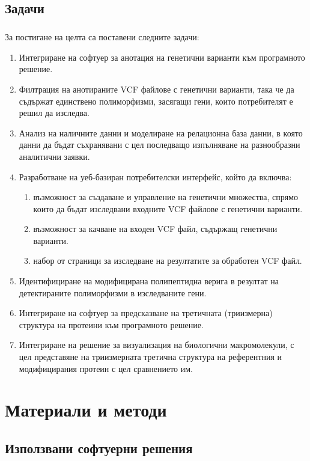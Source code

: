 \documentclass[pdftex,cyrillic,14pt,a4page,twoside,openright]{extreport}
\begin{document}
\section{Задачи}
\paragraph{}
За постигане на целта са поставени следните задачи:
\begin{enumerate}
	\item Интегриране на софтуер за анотация на генетични варианти към програмното решение.
	\item Филтрация на анотираните VCF файлове с генетични варианти, така че да съдържат единствено полиморфизми, засягащи гени, които потребителят е решил да изследва.
	\item Анализ на наличните данни и моделиране на релационна база данни, в която данни да бъдат съхранявани с цел последващо изпълняване на разнообразни аналитични заявки.
	\item Разработване на уеб-базиран потребителски интерфейс, който да включва:
		\begin{enumerate}
			\item възможност за създаване и управление на генетични множества, спрямо които да бъдат изследвани входните VCF файлове с генетични варианти.
			\item възможност за качване на входен VCF файл, съдържащ генетични варианти.
			\item набор от страници за изследване на резултатите за обработен VCF файл.
		\end{enumerate}
	\item Идентифициране на модифицирана полипептидна верига в резултат на детектираните полиморфизми в изследваните гени.
	\item Интегриране на софтуер за предсказване на третичната (триизмерна) структура на протеини към програмното решение.
	\item Интегриране на решение за визуализация на биологични макромолекули, с цел представяне на триизмерната третична структура на референтния и модифицирания протеин с цел сравнението им.
\end{enumerate}

\chapter{Материали и методи}

\section{Използвани софтуерни решения}
\end{document}
